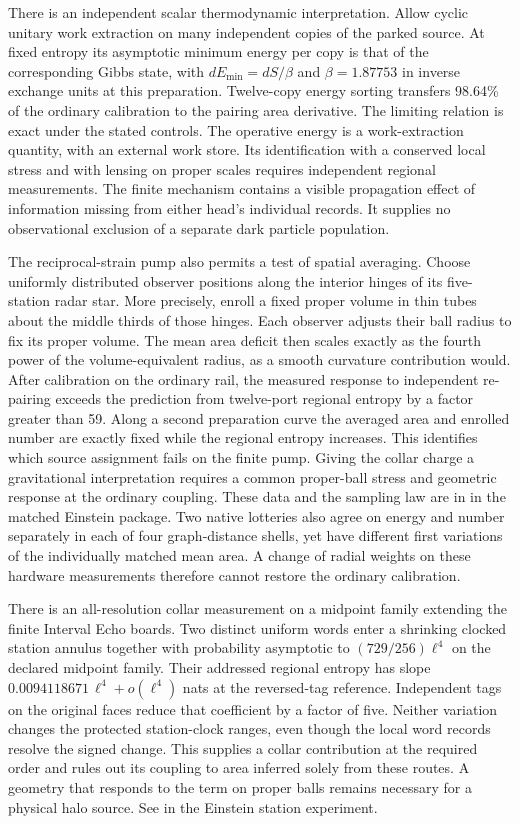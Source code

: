 \documentclass[11pt]{article}
\begin{document}
There is an independent scalar thermodynamic interpretation.
Allow cyclic unitary work extraction on many independent copies of
the parked source. At fixed entropy its asymptotic minimum energy
per copy is that of the corresponding Gibbs state, with
\(dE_{\min}=dS/\beta\) and \(\beta=1.87753\) in inverse exchange
units at this preparation. Twelve-copy energy sorting transfers
98.64\% of the ordinary calibration to the pairing area derivative.
The limiting relation is exact under the stated controls. The
operative energy is a work-extraction quantity, with an external
work store. Its identification with a conserved local stress and
with lensing on proper scales requires independent regional
measurements. The finite mechanism contains a visible propagation
effect of information missing from either head's individual
records. It supplies no observational exclusion of a separate
dark particle population.

The reciprocal-strain pump also permits a test of spatial averaging.
Choose uniformly distributed observer positions along the interior
hinges of its five-station radar star. More precisely, enroll a fixed
proper volume in thin tubes about the middle thirds of those hinges.
Each observer adjusts their ball radius to fix its proper volume. The
mean area deficit then scales exactly as the fourth power of the
volume-equivalent radius, as a smooth curvature contribution would.
After calibration on the ordinary rail, the measured response to
independent re-pairing exceeds the prediction from twelve-port regional
entropy by a factor greater than 59. Along a second preparation curve
the averaged area and enrolled number are exactly fixed while the
regional entropy increases. This identifies which source assignment
fails on the finite pump. Giving the collar charge a gravitational
interpretation requires a common proper-ball stress and geometric
response at the ordinary coupling. These data and the sampling law
are in 
in the matched Einstein package. Two native lotteries also agree on
energy and number separately in each of four graph-distance shells, yet
have different first variations of the individually matched mean area.
A change of radial weights on these hardware measurements therefore
cannot restore the ordinary calibration.

There is an all-resolution collar measurement on a midpoint family
extending the finite Interval Echo boards.
Two distinct uniform words enter a shrinking clocked station annulus
together with probability asymptotic to $(729/256)\ell^4$ on the
declared midpoint family. Their addressed regional entropy has slope
$0.0094118671\,\ell^4+o(\ell^4)$ nats at the reversed-tag reference.
Independent tags on the original faces reduce that coefficient by a
factor of five. Neither variation changes the protected station-clock
ranges, even though the local word records resolve the signed change.
This supplies a collar contribution at the required order and rules
out its coupling to area inferred solely from these routes. A geometry
that responds to the term on proper balls remains necessary for a physical
halo source. See  in the Einstein
station experiment.
\end{document}
